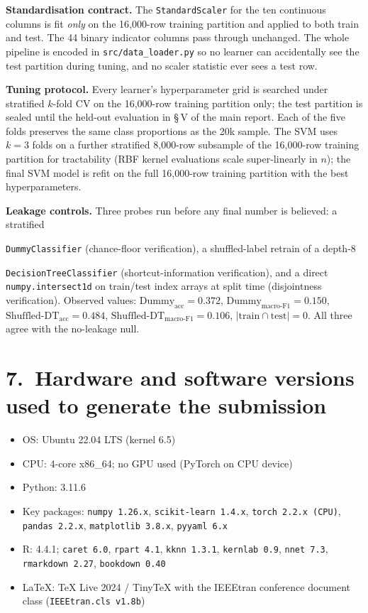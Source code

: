 \documentclass[11pt]{article}
\begin{document}
\noindent\textbf{Standardisation contract.} The \texttt{StandardScaler} for
the ten continuous columns is fit \emph{only} on the 16{,}000-row training
partition and applied to both train and test. The 44 binary indicator
columns pass through unchanged. The whole pipeline is encoded in
\texttt{src/data\_loader.py} so no learner can accidentally see the test
partition during tuning, and no scaler statistic ever sees a test row.

\noindent\textbf{Tuning protocol.} Every learner's hyperparameter grid is
searched under stratified $k$-fold CV on the 16{,}000-row training
partition only; the test partition is sealed until the held-out evaluation
in \S\,V of the main report. Each of the five folds preserves the same
class proportions as the 20k sample. The SVM uses $k{=}3$ folds on a further
stratified 8{,}000-row subsample of the 16{,}000-row training partition
for tractability (RBF kernel evaluations scale super-linearly in $n$); the
final SVM model is refit on the full 16{,}000-row training partition with
the best hyperparameters.

\noindent\textbf{Leakage controls.} Three probes run before any final
number is believed: a stratified 

\texttt{DummyClassifier} (chance-floor
verification), a shuffled-label retrain of a depth-8

\texttt{DecisionTreeClassifier} (shortcut-information verification), and a
direct \texttt{numpy.intersect1d} on train/test index arrays at split time
(disjointness verification). Observed values:
$\text{Dummy}_{\text{acc}}{=}0.372$,
$\text{Dummy}_{\text{macro-F1}}{=}0.150$,
$\text{Shuffled-DT}_{\text{acc}}{=}0.484$,
$\text{Shuffled-DT}_{\text{macro-F1}}{=}0.106$,
$|\text{train} \cap \text{test}|{=}0$.
All three agree with the no-leakage null.

\section*{7.\ Hardware and software versions used to generate the submission}
\begin{itemize}[leftmargin=*,nosep]
  \item OS: Ubuntu 22.04 LTS (kernel 6.5)
  \item CPU: 4-core x86\_64; no GPU used (PyTorch on CPU device)
  \item Python: 3.11.6
  \item Key packages: \texttt{numpy 1.26.x}, \texttt{scikit-learn 1.4.x},
        \texttt{torch 2.2.x (CPU)}, \texttt{pandas 2.2.x},
        \texttt{matplotlib 3.8.x}, \texttt{pyyaml 6.x}
  \item R: 4.4.1; \texttt{caret 6.0}, \texttt{rpart 4.1}, \texttt{kknn 1.3.1},
        \texttt{kernlab 0.9}, \texttt{nnet 7.3}, \texttt{rmarkdown 2.27},
        \texttt{bookdown 0.40}
  \item LaTeX: TeX Live 2024 / TinyTeX with the IEEEtran conference
        document class (\texttt{IEEEtran.cls v1.8b})
\end{itemize}
\end{document}
